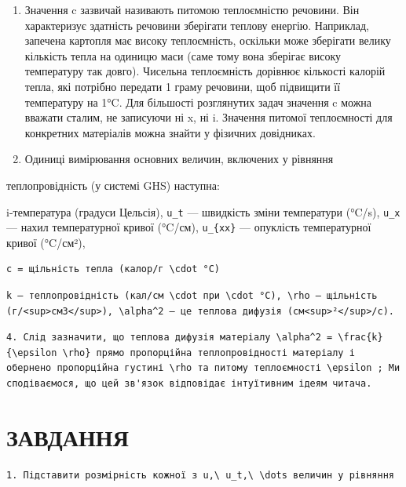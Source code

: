 \documentclass[
  ukrainian,
]{article}
\begin{document}
\begin{enumerate}
\def\labelenumi{\arabic{enumi}.}
\setcounter{enumi}{1}
\item
  Значення c зазвичай називають питомою теплоємністю речовини. Він
  характеризує здатність речовини зберігати теплову енергію. Наприклад,
  запечена картопля має високу теплоємність, оскільки може зберігати
  велику кількість тепла на одиницю маси (саме тому вона зберігає високу
  температуру так довго). Чисельна теплоємність дорівнює кількості
  калорій тепла, які потрібно передати 1 граму речовини, щоб підвищити
  її температуру на 1°C. Для більшості розглянутих задач значення c
  можна вважати сталим, не записуючи ні x, ні i. Значення питомої
  теплоємності для конкретних матеріалів можна знайти у фізичних
  довідниках.
\item
  Одиниці вимірювання основних величин, включених у рівняння
\end{enumerate}

теплопровідність (у системі GHS) наступна:

i-температура (градуси Цельсія), \texttt{u\_t} --- швидкість зміни
температури (°C/s), \texttt{u\_x} --- нахил температурної кривої
(°C/см), \texttt{u\_\{xx\}} --- опуклість температурної кривої (°C/см²),

\begin{verbatim}
c = щільність тепла (калор/г \cdot °C)
\end{verbatim}

\begin{verbatim}
k — теплопровідність (кал/см \cdot при \cdot °C), \rho — щільність (г/<sup>см3</sup>), \alpha^2 — це теплова дифузія (см<sup>²</sup>/с).
\end{verbatim}

\begin{verbatim}
4. Слід зазначити, що теплова дифузія матеріалу \alpha^2 = \frac{k}{\epsilon \rho} прямо пропорційна теплопровідності матеріалу і обернено пропорційна густині \rho та питому теплоємності \epsilon ; Ми сподіваємося, що цей зв'язок відповідає інтуїтивним ідеям читача.
\end{verbatim}

\section{ЗАВДАННЯ}\label{ux437ux430ux432ux434ux430ux43dux43dux44f-2}

\begin{verbatim}
1. Підставити розмірність кожної з u,\ u_t,\ \dots величин у рівняння
\end{verbatim}
\end{document}
